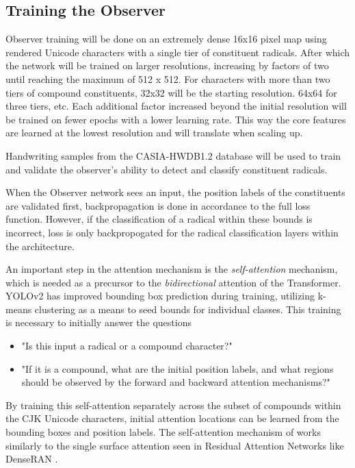 \subsection{Training the Observer}
Observer training will be done on an extremely dense 16x16 pixel map using rendered Unicode characters with a single tier of constituent radicals. After which the network will be trained on larger resolutions,  increasing by factors of two until reaching the maximum of 512 x 512. For characters with more than two tiers of compound constituents, 32x32 will be the starting resolution. 64x64 for three tiers, etc. Each additional factor increased beyond the initial resolution will be trained on fewer epochs with a lower learning rate. This way the core features are learned at the lowest resolution and will translate when scaling up.

Handwriting samples from the CASIA-HWDB1.2 database \cite{casia-handwriting-db} will be used to train and validate the observer's ability to detect and classify constituent radicals.

When the Observer network sees an input, the position labels of the constituents are validated first, backpropagation is done in accordance to the full loss function. However, if the classification of a radical within these bounds is incorrect, loss is only backpropogated for the radical classification layers within the architecture.

An important step in the attention mechanism is the \textit{self-attention} mechanism, which is needed as a precursor to the \textit{bidirectional} attention of the Transformer. YOLOv2 has improved bounding box prediction during training, utilizing k-means clustering as a means to seed bounds for individual classes\cite{yolo}. This training is necessary to initially answer the questions

\begin{itemize}
    \item "Is this input a radical or a compound character?"
    \item "If it is a compound, what are the initial position labels, and what regions should be observed by the forward and backward attention mechanisms?"
\end{itemize}

By training this self-attention separately across the subset of compounds within the CJK Unicode characters, initial attention locations can be learned from the bounding boxes and position labels. The self-attention mechanism of works similarly to the single surface attention seen in Residual Attention Networks \cite {residual-attention} like DenseRAN \cite{denseran}.

